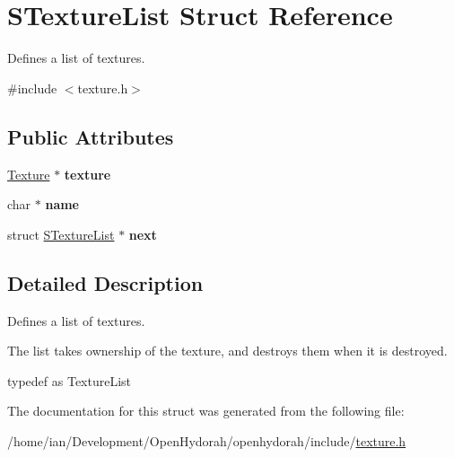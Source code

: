 \hypertarget{structSTextureList}{\section{S\-Texture\-List Struct Reference}
\label{structSTextureList}
}


Defines a list of textures.  




{\ttfamily \#include $<$texture.\-h$>$}

\subsection*{Public Attributes}
\begin{DoxyCompactItemize}
\item 
\hypertarget{structSTextureList_a12a939ee35828a58f4ea26ac2777d617}{\hyperlink{structTexture}{Texture} $\ast$ {\bfseries texture}}\label{structSTextureList_a12a939ee35828a58f4ea26ac2777d617}

\item 
\hypertarget{structSTextureList_a71372f0acb0b3ef302a41736a2e371fa}{char $\ast$ {\bfseries name}}\label{structSTextureList_a71372f0acb0b3ef302a41736a2e371fa}

\item 
\hypertarget{structSTextureList_a9b4b681aca1776d217b6c75541a3faeb}{struct \hyperlink{structSTextureList}{S\-Texture\-List} $\ast$ {\bfseries next}}\label{structSTextureList_a9b4b681aca1776d217b6c75541a3faeb}

\end{DoxyCompactItemize}


\subsection{Detailed Description}
Defines a list of textures. 

The list takes ownership of the texture, and destroys them when it is destroyed.

typedef as Texture\-List 

The documentation for this struct was generated from the following file\-:\begin{DoxyCompactItemize}
\item 
/home/ian/\-Development/\-Open\-Hydorah/openhydorah/include/\hyperlink{texture_8h}{texture.\-h}\end{DoxyCompactItemize}
